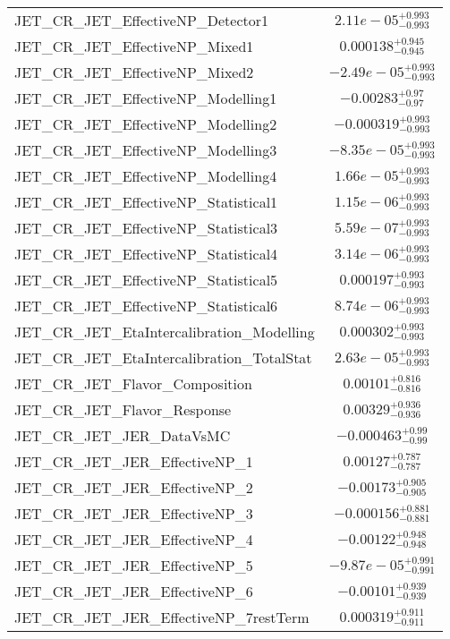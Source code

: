 \begin{tabular}{|l|c|}
JET\_CR\_JET\_EffectiveNP\_Detector1 & $2.11e-05^{+0.993}_{-0.993}$ \\
JET\_CR\_JET\_EffectiveNP\_Mixed1 & $0.000138^{+0.945}_{-0.945}$ \\
JET\_CR\_JET\_EffectiveNP\_Mixed2 & $-2.49e-05^{+0.993}_{-0.993}$ \\
JET\_CR\_JET\_EffectiveNP\_Modelling1 & $-0.00283^{+0.97}_{-0.97}$ \\
JET\_CR\_JET\_EffectiveNP\_Modelling2 & $-0.000319^{+0.993}_{-0.993}$ \\
JET\_CR\_JET\_EffectiveNP\_Modelling3 & $-8.35e-05^{+0.993}_{-0.993}$ \\
JET\_CR\_JET\_EffectiveNP\_Modelling4 & $1.66e-05^{+0.993}_{-0.993}$ \\
JET\_CR\_JET\_EffectiveNP\_Statistical1 & $1.15e-06^{+0.993}_{-0.993}$ \\
JET\_CR\_JET\_EffectiveNP\_Statistical3 & $5.59e-07^{+0.993}_{-0.993}$ \\
JET\_CR\_JET\_EffectiveNP\_Statistical4 & $3.14e-06^{+0.993}_{-0.993}$ \\
JET\_CR\_JET\_EffectiveNP\_Statistical5 & $0.000197^{+0.993}_{-0.993}$ \\
JET\_CR\_JET\_EffectiveNP\_Statistical6 & $8.74e-06^{+0.993}_{-0.993}$ \\
JET\_CR\_JET\_EtaIntercalibration\_Modelling & $0.000302^{+0.993}_{-0.993}$ \\
JET\_CR\_JET\_EtaIntercalibration\_TotalStat & $2.63e-05^{+0.993}_{-0.993}$ \\
JET\_CR\_JET\_Flavor\_Composition & $0.00101^{+0.816}_{-0.816}$ \\
JET\_CR\_JET\_Flavor\_Response & $0.00329^{+0.936}_{-0.936}$ \\
JET\_CR\_JET\_JER\_DataVsMC & $-0.000463^{+0.99}_{-0.99}$ \\
JET\_CR\_JET\_JER\_EffectiveNP\_1 & $0.00127^{+0.787}_{-0.787}$ \\
JET\_CR\_JET\_JER\_EffectiveNP\_2 & $-0.00173^{+0.905}_{-0.905}$ \\
JET\_CR\_JET\_JER\_EffectiveNP\_3 & $-0.000156^{+0.881}_{-0.881}$ \\
JET\_CR\_JET\_JER\_EffectiveNP\_4 & $-0.00122^{+0.948}_{-0.948}$ \\
JET\_CR\_JET\_JER\_EffectiveNP\_5 & $-9.87e-05^{+0.991}_{-0.991}$ \\
JET\_CR\_JET\_JER\_EffectiveNP\_6 & $-0.00101^{+0.939}_{-0.939}$ \\
JET\_CR\_JET\_JER\_EffectiveNP\_7restTerm & $0.000319^{+0.911}_{-0.911}$ \\

\end{tabular}

